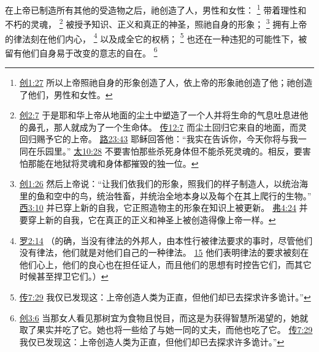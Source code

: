 \documentclass[12pt, a4paper, oneside]{ctexart}
\newcounter{parnum}[section]
\newcommand{\N}{%
   \noindent\refstepcounter{parnum}%
    \makebox[\parindent][l]{\textbf{\arabic{parnum}.}}}
\begin{document}
\N 在上帝已制造所有其他的受造物之后，祂创造了人，男性和女性：
	\footnote {
		\href{https://biblehub.com/genesis/1-27.htm}{创1:27} 所以上帝照祂自身的形象创造了人，依上帝的形象祂创造了他；祂创造了他们，男性和女性。
	}
	带着理性和不朽的灵魂，
	\footnote {
		\href{https://biblehub.com/genesis/2-7.htm}{创2:7} 于是耶和华上帝从地面的尘土中塑造了一个人并将生命的气息吐息进他的鼻孔，那人就成为了一个生命体。
		\href{https://biblehub.com/ecclesiastes/12-7.htm}{传12:7} 而尘土回归它来自的地面，而灵回归赐予它的上帝。
		\href{https://biblehub.com/luke/23-43.htm}{路23:43} 耶稣回答他：“我实在告诉你，今天你将与我一同在乐园里。”
		\href{https://biblehub.com/matthew/10-28.htm}{太10:28} 不要害怕那些杀死身体但不能杀死灵魂的。相反，要害怕那能在地狱将灵魂和身体都摧毁的独一位。
	}
	被授予知识、正义和真正的神圣，照祂自身的形象；
	\footnote {
		\href{https://biblehub.com/genesis/1-26.htm}{创1:26} 然后上帝说：“让我们依我们的形象，照我们的样子制造人，以统治海里的鱼和空中的鸟，统治牲畜，并统治全地本身以及每个在其上爬行的生物。”
		\href{https://biblehub.com/colossians/3-10.htm}{西3:10} 并已穿上新的自我，它正照造物主的形象在知识上被更新。
		\href{https://biblehub.com/ephesians/4-24.htm}{弗4:24} 并要穿上新的自我，它在真正的正义和神圣上被创造得像上帝一样。
	}
	拥有上帝的律法刻在他们内心，
	\footnote {
		\href{https://biblehub.com/romans/2-14.htm}{罗2:14} （的确，当没有律法的外邦人，由本性行被律法要求的事时，尽管他们没有律法，他们就是对他们自己的一种律法。
		\href{https://biblehub.com/romans/2-15.htm}{15} 他们表明律法的要求被刻在他们心上，他们的良心也在担任证人，而且他们的思想有时控告它们，而其它时候甚至捍卫它们。）
	}
	以及成全它的权柄；
	\footnote {
		\href{https://biblehub.com/ecclesiastes/7-29.htm}{传7:29} 我仅已发现这：上帝创造人类为正直，但他们却已去探求许多诡计。”
	}
	也还在一种违犯的可能性下，被留有他们自身易于改变的意志的自在。
	\footnote {
		\href{https://biblehub.com/genesis/3-6.htm}{创3:6} 当那女人看见那树宜为食物且悦目，而这是为获得智慧所渴望的，她就取了果实并吃了它。她也将一些给了与她一同的丈夫，而他也吃了它。
		\href{https://biblehub.com/ecclesiastes/7-29.htm}{传7:29} 我仅已发现这：上帝创造人类为正直，但他们却已去探求许多诡计。”
	}
\end{document}
